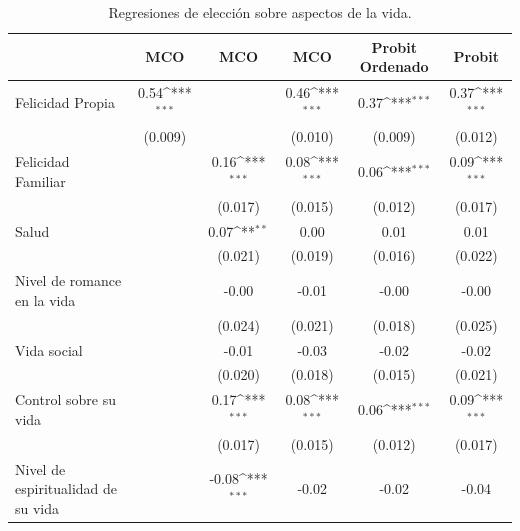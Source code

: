 \documentclass[12pt,spanish]{article}
\begin{document}
\begin{table}[H]
    \centering
    \caption{Regresiones de elección sobre aspectos de la vida.}
    {
\def\sym#1{\ifmmode^{#1}\else\(^{#1}\)\fi}
\begin{tabular}{l*{5}{c}}
\hline\hline
            &\multicolumn{1}{c}{MCO}&\multicolumn{1}{c}{MCO}&\multicolumn{1}{c}{MCO}&\multicolumn{1}{c}{Probit Ordenado}&\multicolumn{1}{c}{Probit}\\
\hline
Felicidad Propia&        0.54\sym{***}&                     &        0.46\sym{***}&        0.37\sym{***}&        0.37\sym{***}\\
            &     (0.009)         &                     &     (0.010)         &     (0.009)         &     (0.012)         \\
[1em]
Felicidad Familiar&                     &        0.16\sym{***}&        0.08\sym{***}&        0.06\sym{***}&        0.09\sym{***}\\
            &                     &     (0.017)         &     (0.015)         &     (0.012)         &     (0.017)         \\
[1em]
Salud      &                     &        0.07\sym{**} &        0.00         &        0.01         &        0.01         \\
            &                     &     (0.021)         &     (0.019)         &     (0.016)         &     (0.022)         \\
[1em]
Nivel de romance en la vida&                     &       -0.00         &       -0.01         &       -0.00         &       -0.00         \\
            &                     &     (0.024)         &     (0.021)         &     (0.018)         &     (0.025)         \\
[1em]
Vida social &                     &       -0.01         &       -0.03         &       -0.02         &       -0.02         \\
            &                     &     (0.020)         &     (0.018)         &     (0.015)         &     (0.021)         \\
[1em]
Control sobre su vida&                     &        0.17\sym{***}&        0.08\sym{***}&        0.06\sym{***}&        0.09\sym{***}\\
            &                     &     (0.017)         &     (0.015)         &     (0.012)         &     (0.017)         \\
[1em]
Nivel de espiritualidad de su vida&                     &       -0.08\sym{***}&       -0.02         &       -0.02         &       -0.04         \\

\end{tabular}}
\end{table}
\end{document}
